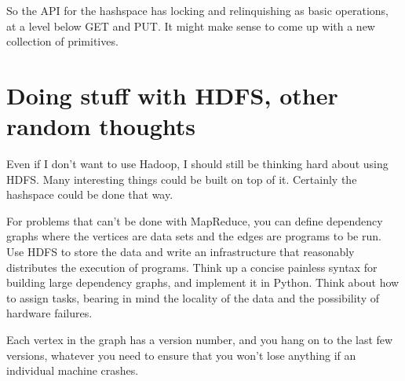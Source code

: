 \documentclass[11pt]{article}
\begin{document}
So the API for the hashspace has locking and relinquishing as basic
operations, at a level below GET and PUT. It might make sense to come
up with a new collection of primitives.

\section{Doing stuff with HDFS, other random thoughts}

Even if I don't want to use Hadoop, I should still be thinking hard
about using HDFS. Many interesting things could be built on top of it.
Certainly the hashspace could be done that way.

For problems that can't be done with MapReduce, you can define
dependency graphs where the vertices are data sets and the edges are
programs to be run. Use HDFS to store the data and write an
infrastructure that reasonably distributes the execution of programs.
Think up a concise painless syntax for building large dependency
graphs, and implement it in Python. Think about how to assign tasks,
bearing in mind the locality of the data and the possibility of
hardware failures.

Each vertex in the graph has a version number, and you hang on to the
last few versions, whatever you need to ensure that you won't lose
anything if an individual machine crashes.

\printindex
\end{document}
